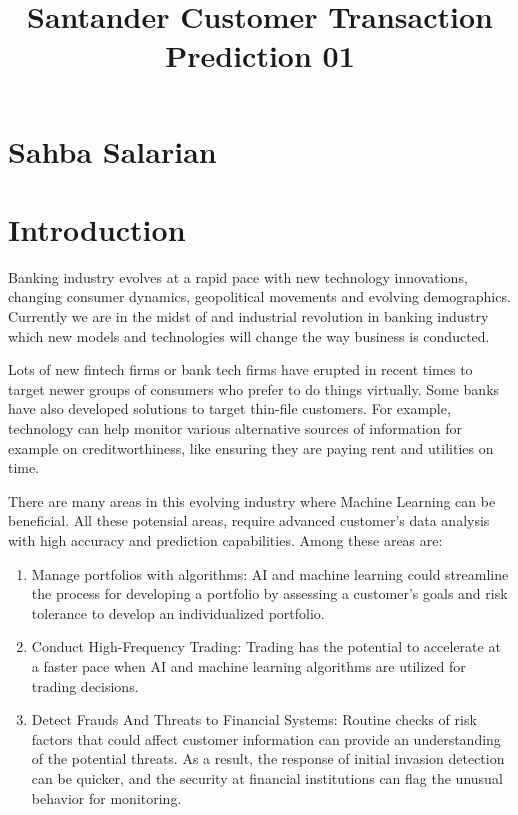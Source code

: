 \documentclass[11pt]{article}
\title{Santander Customer Transaction Prediction 01}
\providecommand{\tightlist}{%
      \setlength{\itemsep}{0pt}\setlength{\parskip}{0pt}}
\begin{document}
    
    
    \maketitle
    
    

    
    \hypertarget{sahba-salarian}{%
\section{Sahba Salarian}\label{sahba-salarian}}

    \hypertarget{introduction}{%
\section{Introduction}\label{introduction}}

    Banking industry evolves at a rapid pace with new technology
innovations, changing consumer dynamics, geopolitical movements and
evolving demographics. Currently we are in the midst of and industrial
revolution in banking industry which new models and technologies will
change the way business is conducted.

Lots of new fintech firms or bank tech firms have erupted in recent
times to target newer groups of consumers who prefer to do things
virtually. Some banks have also developed solutions to target thin-file
customers. For example, technology can help monitor various alternative
sources of information for example on creditworthiness, like ensuring
they are paying rent and utilities on time.

There are many areas in this evolving industry where Machine Learning
can be beneficial. All these potensial areas, require advanced
customer's data analysis with high accuracy and prediction capabilities.
Among these areas are:

\begin{enumerate}
\def\labelenumi{\arabic{enumi}.}
\tightlist
\item
  Manage portfolios with algorithms: AI and machine learning could
  streamline the process for developing a portfolio by assessing a
  customer's goals and risk tolerance to develop an individualized
  portfolio.
\item
  Conduct High-Frequency Trading: Trading has the potential to
  accelerate at a faster pace when AI and machine learning algorithms
  are utilized for trading decisions.
\item
  Detect Frauds And Threats to Financial Systems: Routine checks of risk
  factors that could affect customer information can provide an
  understanding of the potential threats. As a result, the response of
  initial invasion detection can be quicker, and the security at
  financial institutions can flag the unusual behavior for monitoring.
\end{enumerate}
\end{document}
